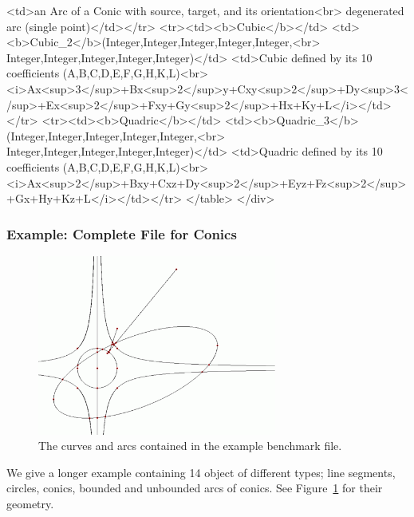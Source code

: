 \begin{ccHtmlOnly}
    <td>an Arc of a Conic with source, target, and its orientation<br>
        degenerated arc (single point)</td></tr>
<tr><td><b>Cubic</b></td>
    <td><b>Cubic_2</b>(Integer,Integer,Integer,Integer,Integer,<br>
                       Integer,Integer,Integer,Integer,Integer)</td>
    <td>Cubic defined by its 10 coefficients (A,B,C,D,E,F,G,H,K,L)<br>
        <i>Ax<sup>3</sup>+Bx<sup>2</sup>y+Cxy<sup>2</sup>+Dy<sup>3</sup>+Ex<sup>2</sup>+Fxy+Gy<sup>2</sup>+Hx+Ky+L</i></td></tr>
<tr><td><b>Quadric</b></td>
    <td><b>Quadric_3</b>(Integer,Integer,Integer,Integer,Integer,<br>
                         Integer,Integer,Integer,Integer,Integer)</td>
    <td>Quadric defined by its 10 coefficients (A,B,C,D,E,F,G,H,K,L)<br>
        <i>Ax<sup>2</sup>+Bxy+Cxz+Dy<sup>2</sup>+Eyz+Fz<sup>2</sup>+Gx+Hy+Kz+L</i></td></tr>
</table>
</div>
\end{ccHtmlOnly}

\subsubsection {Example: Complete File for Conics}
\label{longexample}

\begin{figure}
\begin{ccTexOnly}
\centerline{\includegraphics[width=0.7\textwidth]{Benchmark/fig/Conics_14_1}}
\end{ccTexOnly}
\caption{The curves and arcs contained in the example benchmark file.
  \label{fig:example}}
\end{figure}

We give a longer example containing 14 object of different types; line
segments, circles, conics, bounded and unbounded arcs of conics. See
Figure~\ref{fig:example} for their geometry.


